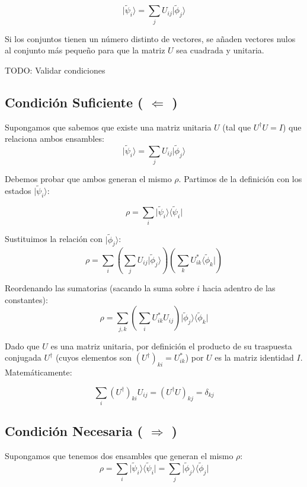 \documentclass[11pt]{article}
\begin{document}
\[\vert{}\tilde{\psi}_i\rangle = \sum_j U_{ij} \vert{}\tilde{\phi}_j\rangle\]

Si los conjuntos tienen un número distinto de vectores, se añaden
vectores nulos al conjunto más pequeño para que la matriz \(U\) sea
cuadrada y unitaria.

TODO: Validar condiciones

\subsection{\texorpdfstring{Condición Suficiente ( \(\Leftarrow\)
)}{Condición Suficiente ( \textbackslash Leftarrow )}}\label{condiciuxf3n-suficiente-leftarrow}

Supongamos que sabemos que existe una matriz unitaria \(U\) (tal que
\(U^\dagger U = I\)) que relaciona ambos ensambles:
\[\vert{}\tilde{\psi}_i\rangle = \sum_j U_{ij} \vert{}\tilde{\phi}_j\rangle\]

Debemos probar que ambos generan el mismo \(\rho\). Partimos de la
definición con los estados \(\vert{}\tilde{\psi}_i\rangle\):

\[\rho = \sum_i \vert{}\tilde{\psi}_i\rangle \langle \tilde{\psi}_i\vert{}\]

Sustituimos la relación con \(\vert{}\tilde{\phi}_j\rangle\):
\[\rho = \sum_i \left( \sum_j U_{ij} \vert{}\tilde{\phi}_j\rangle \right) \left( \sum_k U_{ik}^* \langle \tilde{\phi}_k\vert{} \right)\]

Reordenando las sumatorias (sacando la suma sobre \(i\) hacia adentro de
las constantes):
\[\rho = \sum_{j,k} \left( \sum_i U_{ik}^* U_{ij} \right) \vert{}\tilde{\phi}_j\rangle \langle \tilde{\phi}_k\vert{}\]

Dado que \(U\) es una matriz unitaria, por definición el producto de su
traspuesta conjugada \(U^\dagger\) (cuyos elementos son
\((U^\dagger)_{ki} = U_{ik}^*\)) por \(U\) es la matriz identidad \(I\).
Matemáticamente:

\[\sum_i (U^\dagger)_{ki} U_{ij} = (U^\dagger U)_{kj} = \delta_{kj}\]

\subsection{\texorpdfstring{Condición Necesaria ( \(\Rightarrow\)
)}{Condición Necesaria ( \textbackslash Rightarrow )}}\label{condiciuxf3n-necesaria-rightarrow}

Supongamos que tenemos dos ensambles que generan el mismo \(\rho\):
\[\rho = \sum_i \vert{}\tilde{\psi}_i\rangle \langle \tilde{\psi}_i\vert{} = \sum_j \vert{}\tilde{\phi}_j\rangle \langle \tilde{\phi}_j\vert{}\]
\end{document}
